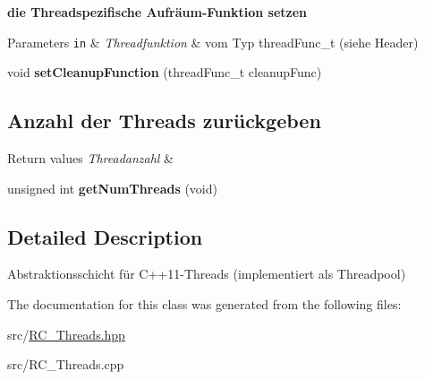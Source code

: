 \begin{Indent}{\bf die Threadspezifische Aufräum-\/\+Funktion setzen}\par
{\em 
\begin{DoxyParams}[1]{Parameters}
\mbox{\tt in}  & {\em Threadfunktion} & vom Typ thread\+Func\+\_\+t (siehe Header) \\
\hline
\end{DoxyParams}
}\begin{DoxyCompactItemize}
\item 
\hypertarget{classrc_1_1Threads_a7abae9fbecce24a32cb61093fa113c31}{void {\bfseries set\+Cleanup\+Function} (thread\+Func\+\_\+t cleanup\+Func)}\label{classrc_1_1Threads_a7abae9fbecce24a32cb61093fa113c31}

\end{DoxyCompactItemize}
\end{Indent}
\subsection*{Anzahl der Threads zurückgeben}
\label{_amgrp1bdb4b6a9934021f3af24b7d4c6d6100}%

\begin{DoxyRetVals}{Return values}
{\em Threadanzahl} & \\
\hline
\end{DoxyRetVals}
\begin{DoxyCompactItemize}
\item 
\hypertarget{classrc_1_1Threads_a753ffe65e138ba7e3eda028a9590f1e7}{unsigned int {\bfseries get\+Num\+Threads} (void)}\label{classrc_1_1Threads_a753ffe65e138ba7e3eda028a9590f1e7}

\end{DoxyCompactItemize}


\subsection{Detailed Description}
Abstraktionsschicht für C++11-\/\+Threads (implementiert als Threadpool) 

The documentation for this class was generated from the following files\+:\begin{DoxyCompactItemize}
\item 
src/\hyperlink{RC__Threads_8hpp}{R\+C\+\_\+\+Threads.\+hpp}\item 
src/R\+C\+\_\+\+Threads.\+cpp\end{DoxyCompactItemize}
